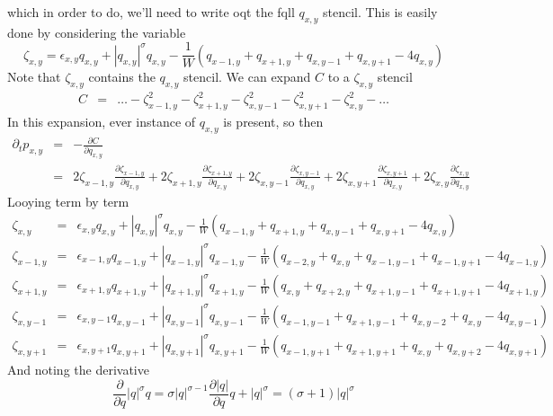 \documentclass[12pt, a4paper, prl]{revtex4}
\newcommand{\abs}[1]{\left| #1 \right|}
\begin{document}
which in order to do, we'll need to write oqt the fqll $q_{x,y}$ stencil. This is easily done
by considering the variable 
\begin{equation*}
\zeta_{x,y} = 
  \epsilon_{x,y} q_{x,y} + \abs{q_{x,y}}^\sigma q_{x,y} - \frac{1}{W}\left( q_{x-1,y} + q_{x+1,y} + q_{x,y-1} + q_{x,y+1} - 4q_{x,y} \right) 
\end{equation*}
Note that $\zeta_{x,y}$ contains the $q_{x,y}$ stencil. We can expand $C$ to a $\zeta_{x,y}$ stencil
\begin{eqnarray*}
C &=& \ldots -  \zeta_{x-1,y}^2 - \zeta_{x+1,y}^2 - \zeta_{x,y-1}^2 - \zeta_{x,y+1}^2 - \zeta_{x,y}^2 - \ldots  
\end{eqnarray*}
In this expansion, ever instance of $q_{x,y}$ is present, so then
\begin{eqnarray*}
 \partial_t p_{x,y} &=& -\frac{\partial C}{\partial q_{x,y}} \\
 &=& 2 \zeta_{x-1,y} \frac{\partial\zeta_{x-1,y}}{\partial q_{x,y}} + 
 2\zeta_{x+1,y} \frac{\partial\zeta_{x+1,y}}{\partial q_{x,y}} +
 2 \zeta_{x,y-1}\frac{\partial\zeta_{x,y-1}}{\partial q_{x,y}} + 
 2 \zeta_{x,y+1}\frac{\partial\zeta_{x,y+1}}{\partial q_{x,y}} + 
 2 \zeta_{x,y}\frac{\partial\zeta_{x,y}}{\partial q_{x,y}}
\end{eqnarray*}
Looying term by term
\begin{eqnarray*}
\zeta_{x,y} &=& \epsilon_{x,y} q_{x,y} + \abs{q_{x,y}}^\sigma q_{x,y} - \frac{1}{W}\left( q_{x-1,y} + q_{x+1,y} + q_{x,y-1} + q_{x,y+1} - 4q_{x,y} \right) \\
\zeta_{x-1,y} &=& \epsilon_{x-1,y} q_{x-1,y} + \abs{q_{x-1,y}}^\sigma q_{x-1,y} - \frac{1}{W}\left( q_{x-2,y} + q_{x,y} + q_{x-1,y-1} + q_{x-1,y+1} - 4q_{x-1,y} \right) \\
\zeta_{x+1,y} &=& \epsilon_{x+1,y} q_{x+1,y} + \abs{q_{x+1,y}}^\sigma q_{x+1,y} - \frac{1}{W}\left( q_{x,y} + q_{x+2,y} + q_{x+1,y-1} + q_{x+1,y+1} - 4q_{x+1,y} \right) \\
\zeta_{x,y-1} &=& \epsilon_{x,y-1} q_{x,y-1} + \abs{q_{x,y-1}}^\sigma q_{x,y-1} - \frac{1}{W}\left( q_{x-1,y-1} + q_{x+1,y-1} + q_{x,y-2} + q_{x,y} - 4q_{x,y-1} \right) \\
\zeta_{x,y+1} &=& \epsilon_{x,y+1} q_{x,y+1} + \abs{q_{x,y+1}}^\sigma q_{x,y+1} - \frac{1}{W}\left( q_{x-1,y+1} + q_{x+1,y+1} + q_{x,y} + q_{x,y+2} - 4q_{x,y+1} \right) 
\end{eqnarray*}
And noting the derivative
\begin{equation*}
\frac{\partial}{\partial q} \abs{q}^\sigma q = \sigma \abs{q}^{\sigma -1} \frac{\partial \abs{q}}{\partial q} q + \abs{q}^\sigma  = \left(\sigma + 1\right) \abs{q}^\sigma
\end{equation*}
\end{document}
